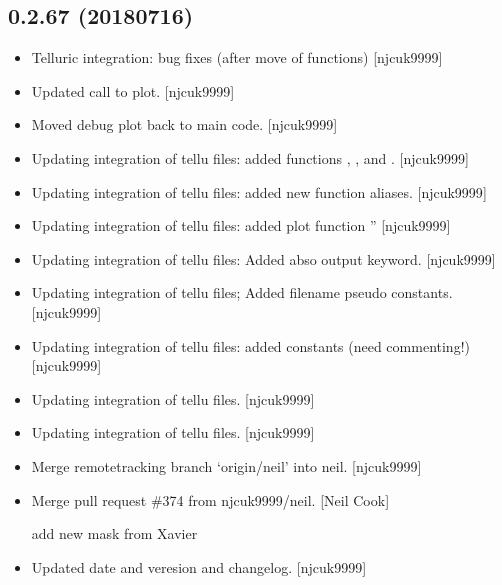 \documentclass[a4paper,10pt,english]{report}
\begin{document}
\subsection{0.2.67 (2018\sphinxhyphen{}07\sphinxhyphen{}16)}
\label{\detokenize{misc/changelog:id411}}\begin{itemize}
\item {} 
Telluric integration: bug fixes (after move of functions) {[}njcuk9999{]}

\item {} 
Updated call to plot. {[}njcuk9999{]}

\item {} 
Moved debug plot back to main code. {[}njcuk9999{]}

\item {} 
Updating integration of tellu files: added functions \sphinxhyphen{}
, ,
 and . {[}njcuk9999{]}

\item {} 
Updating integration of tellu files: added new function aliases.
{[}njcuk9999{]}

\item {} 
Updating integration of tellu files: added plot function
” {[}njcuk9999{]}

\item {} 
Updating integration of tellu files: Added abso output keyword.
{[}njcuk9999{]}

\item {} 
Updating integration of tellu files; Added filename pseudo constants.
{[}njcuk9999{]}

\item {} 
Updating integration of tellu files: added constants (need
commenting!) {[}njcuk9999{]}

\item {} 
Updating integration of tellu files. {[}njcuk9999{]}

\item {} 
Updating integration of tellu files. {[}njcuk9999{]}

\item {} 
Merge remote\sphinxhyphen{}tracking branch ‘origin/neil’ into neil. {[}njcuk9999{]}

\item {} 
Merge pull request \#374 from njcuk9999/neil. {[}Neil Cook{]}

add new mask from Xavier

\item {} 
Updated date and veresion and changelog. {[}njcuk9999{]}

\end{itemize}
\end{document}
